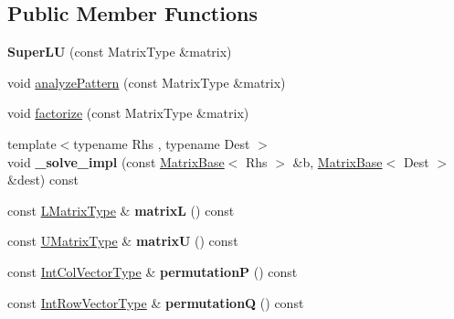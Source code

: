 \subsection*{Public Member Functions}
\begin{DoxyCompactItemize}
\item 
\mbox{\label{class_eigen_1_1_super_l_u_a31d051a622837afe71a5a12f9ca995a7}} 
{\bfseries Super\+LU} (const Matrix\+Type \&matrix)
\item 
void \hyperlink{class_eigen_1_1_super_l_u_a493cdfada27415a6037b004ff974eace}{analyze\+Pattern} (const Matrix\+Type \&matrix)
\item 
void \hyperlink{class_eigen_1_1_super_l_u_a0b5a5fbda1a1f368003c7c01021a4636}{factorize} (const Matrix\+Type \&matrix)
\item 
\mbox{\label{class_eigen_1_1_super_l_u_aff6428de2f43f9d90b640dc713dfd802}} 
{\footnotesize template$<$typename Rhs , typename Dest $>$ }\\void {\bfseries \+\_\+solve\+\_\+impl} (const \hyperlink{group___core___module_class_eigen_1_1_matrix_base}{Matrix\+Base}$<$ Rhs $>$ \&b, \hyperlink{group___core___module_class_eigen_1_1_matrix_base}{Matrix\+Base}$<$ Dest $>$ \&dest) const
\item 
\mbox{\label{class_eigen_1_1_super_l_u_a2b04928559e7dcf1a455a493fe8ca350}} 
const \hyperlink{group___core___module_class_eigen_1_1_triangular_view}{L\+Matrix\+Type} \& {\bfseries matrixL} () const
\item 
\mbox{\label{class_eigen_1_1_super_l_u_a5c848ddb3bd3edd1796f354bd69ac258}} 
const \hyperlink{group___core___module_class_eigen_1_1_triangular_view}{U\+Matrix\+Type} \& {\bfseries matrixU} () const
\item 
\mbox{\label{class_eigen_1_1_super_l_u_adf0826125fe13adc57506f4d0c9617c7}} 
const \hyperlink{group___core___module}{Int\+Col\+Vector\+Type} \& {\bfseries permutationP} () const
\item 
\mbox{\label{class_eigen_1_1_super_l_u_ad136353331d04ab8ae824c3f69513265}} 
const \hyperlink{group___core___module}{Int\+Row\+Vector\+Type} \& {\bfseries permutationQ} () const

\end{DoxyCompactItemize}
